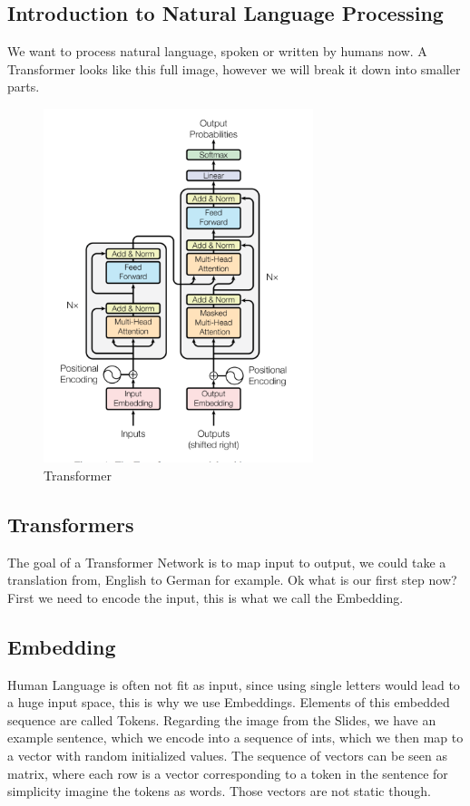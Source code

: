 \documentclass[a4paper]{article}
\begin{document}
    \subsection{Introduction to Natural Language Processing}
    We want to process natural language, spoken or written by humans now. A Transformer looks like this full image, however we will break it down into smaller parts. 
    \begin{figure}[h]
        \centering
        \includegraphics[width=0.7\textwidth]{images/transformer.png}
        \caption{Transformer}
        \label{fig:Transformer}
    \end{figure}    
    \subsection{Transformers}
    The goal of a Transformer Network is to map input to output, we could take a translation from, English to German for example. Ok what is our first step now? First we need to encode the input, this is what we call the Embedding. 
    \subsection{Embedding}
    \newpage
    Human Language is often not fit as input, since using single letters would lead to a huge input space, this is why we use Embeddings. Elements of this embedded sequence are called Tokens. Regarding the image from the Slides, we have an example sentence, which we encode into a sequence of ints, which we then map to a vector with random initialized values. The sequence of vectors can be 
    seen as matrix, where each row is a vector corresponding to a token in the sentence for simplicity imagine the tokens as words. Those vectors are not static though. 
\end{document}
